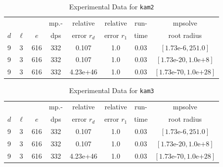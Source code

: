 \documentclass[runningheads]{llncs}
\begin{document}
\begin{table}
\caption{Experimental Data for \texttt{kam2}} %
\label{tab:kam2}
\vskip -0.15in
\begin{center}
\begin{small}
\begin{sc}
\begin{tabular}{lccccccc}
\toprule
&  &  & mp.-& relative  & relative & run- & mpsolve \\
$d$& $\ell$& $e$ & dps&error $r_d$       & error $r_1$ &time& root radius\\
\midrule
 9 & 3 & 616 & 332 & 0.107 & 1.0 & 0.03 & $[1.73\text{e-}6, 251.0]$\\
 9 & 3 & 616 & 332 & 0.107 & 1.0 & 0.03 & $[1.73\text{e-}20, 1.0\text{e+}8]$\\
 9 & 3 & 616 & 332 & 4.23e+46 & 1.0 & 0.03 & $[1.73\text{e-}70, 1.0\text{e+}28]$\\
\bottomrule
\end{tabular}
\end{sc}
\end{small}
\end{center}
\vskip 0.05in
\end{table}

\begin{table}
\caption{Experimental Data for \texttt{kam3}} %
\label{tab:kam3}
\vskip -0.15in
\begin{center}
\begin{small}
\begin{sc}
\begin{tabular}{lccccccc}
\toprule
&  &  & mp.-& relative  & relative & run- & mpsolve \\
$d$& $\ell$& $e$ & dps&error $r_d$       & error $r_1$ &time& root radius\\
\midrule
 9 & 3 & 616 & 332 & 0.107 & 1.0 & 0.03 & $[1.73\text{e-}6, 251.0]$\\
 9 & 3 & 616 & 332 & 0.107 & 1.0 & 0.03 & $[1.73\text{e-}20, 1.0\text{e+}8]$\\
 9 & 3 & 616 & 332 & 4.23e+46 & 1.0 & 0.03 & $[1.73\text{e-}70, 1.0\text{e+}28]$\\
\bottomrule
\end{tabular}
\end{sc}
\end{small}
\end{center}
\vskip 0.05in
\end{table}
\end{document}

